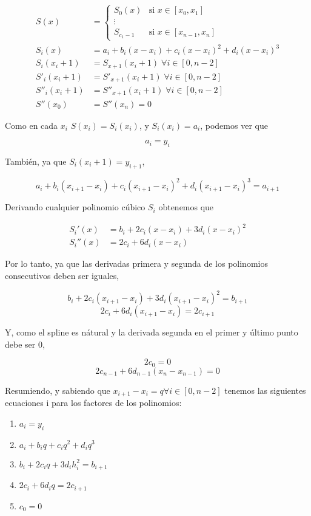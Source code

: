 \[
\begin{split}
S(x) & =
\begin{cases}
	S_0(x) & \text{si } x \in [x_0, x_1] \\
	\vdots \\
	S_{c_1 - 1} & \text{si } x \in [x_{n - 1}, x_n]
\end{cases} \\
S_i(x) & = a_i + b_i(x - x_i) + c_i(x - x_i)^2 + d_i(x - x_i)^3 \\
S_i(x_i + 1) & = S_{x + 1}(x_i + 1) \; \forall i \in [0, n - 2] \\
S'_i(x_i + 1) & = S'_{x + 1}(x_i + 1) \; \forall i \in [0, n - 2] \\
S''_i(x_i + 1) & = S''_{x + 1}(x_i + 1) \; \forall i \in [0, n - 2] \\
S''(x_0) & = S''(x_n) = 0
\end{split}
\]

Como en cada $x_i$ $S(x_i) = S_i(x_i)$, y $S_i(x_i) = a_i$, podemos ver que

\[
a_i = y_i
\]

Tambi\'en, ya que $S_i(x_i + 1) = y_{i + 1}$,

\[
a_i + b_i(x_{i + 1} - x_i) + c_i(x_{i + 1} - x_i)^2 + d_i(x_{i + 1} - x_i)^3 = a_{i + 1}
\]

Derivando cualquier polinomio c\'ubico $S_i$ obtenemos que

\[
\begin{split}
S_i'(x) & = b_i + 2 c_i (x - x_i) + 3 d_i (x - x_i)^2 \\
S_i''(x) & = 2 c_i + 6 d_i (x - x_i)
\end{split}
\]

Por lo tanto, ya que las derivadas primera y segunda de los polinomios
consecutivos deben ser iguales,

\[
b_i + 2 c_i (x_{i + 1} - x_i) + 3 d_i (x_{i + 1} - x_i)^2 = b_{i + 1}
\]
\[
2 c_i + 6 d_i (x_{i + 1} - x_i) = 2 c_{i + 1}
\]

Y, como el spline es n\'atural y la derivada segunda en el primer y \'ultimo
punto debe ser $0$,

\[
2 c_0 = 0
\]
\[
2 c_{n - 1} + 6 d_{n - 1} (x_n - x_{n - 1}) = 0
\]

Resumiendo, y sabiendo que $x_{i + 1} - x_i = q \forall i \in [0, n - 2]$
tenemos las siguientes ecuaciones i para los factores de los polinomios:

\begin{enumerate}
\item $ a_i = y_i $
\item $ a_i + b_i q + c_i q^2 + d_i q^3 $
\item $ b_i + 2 c_i q + 3 d_i h_i^2 = b_{i + 1} $
\item $ 2 c_i + 6 d_i q = 2 c_{i + 1} $
\item $ c_0 = 0 $
\end{enumerate}

